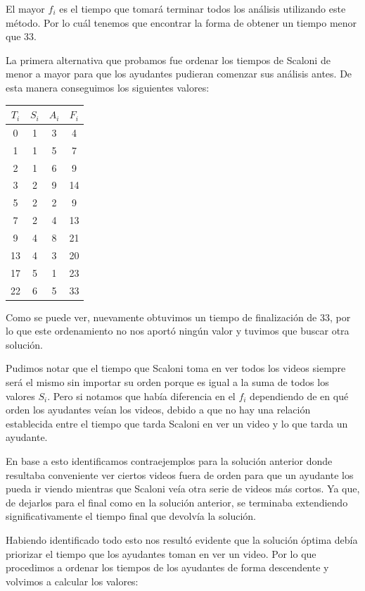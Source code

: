 \documentclass{estilo}
\begin{document}
El mayor $f_i$ es el tiempo que tomará terminar todos los análisis utilizando este método. Por lo cuál tenemos que encontrar la forma de obtener un tiempo menor que 33.

La primera alternativa que probamos fue ordenar los tiempos de Scaloni de menor a mayor para que los ayudantes pudieran comenzar sus análisis antes. De esta manera conseguimos los siguientes valores:
\begin{center}
\begin{tabular}{|c|c|c|c|}
\hline
$T_i$ & $S_i$ & $A_i$ & $F_i$ \\
\hline
0 & 1 & 3 & 4 \\
1 & 1 & 5 & 7 \\
2 & 1 & 6 & 9 \\
3 & 2 & 9 & 14 \\
5 & 2 & 2 & 9 \\
7 & 2 & 4 & 13 \\
9 & 4 & 8 & 21 \\
13 & 4 & 3 & 20 \\
17 & 5 & 1 & 23 \\
22 & 6 & 5 & 33 \\
\hline
\end{tabular}
\end{center}

Como se puede ver, nuevamente obtuvimos un tiempo de finalización de 33, por lo que este ordenamiento no nos aportó ningún valor y tuvimos que buscar otra solución.

Pudimos notar que el tiempo que Scaloni toma en ver todos los videos siempre será el mismo sin importar su orden porque es igual a la suma de todos los valores $S_i$. Pero si notamos que había diferencia en el $f_i$ dependiendo de en qué orden los ayudantes veían los videos, debido a que no hay una relación establecida entre el tiempo que tarda Scaloni en ver un video y lo que tarda un ayudante.

En base a esto identificamos contraejemplos para la solución anterior donde resultaba conveniente ver ciertos videos fuera de orden para que un ayudante los pueda ir viendo mientras que Scaloni veía otra serie de videos más cortos. Ya que, de dejarlos para el final como en la solución anterior, se terminaba extendiendo significativamente el tiempo final que devolvía la solución.

Habiendo identificado todo esto nos resultó evidente que la solución óptima debía priorizar el tiempo que los ayudantes toman en ver un video. Por lo que procedimos a ordenar los tiempos de los ayudantes de forma descendente y volvimos a calcular los valores:
\end{document}
